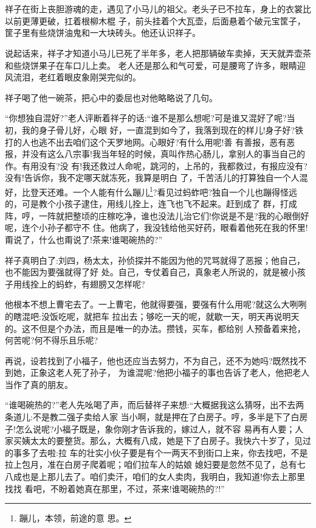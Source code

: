 \documentclass[11pt,a4paper,onecolumn]{article}
\begin{document}
\pagebreak
\section{}

祥子在街上丧胆游魂的走，遇见了小马儿的祖父。老头子已不拉车，身上的衣裳比以前更薄更破，扛着根柳木棍
子，前头挂着个大瓦壶，后面悬着个破元宝筐子，筐子里有些烧饼油鬼和一大块砖头。他还认识祥子。

说起话来，祥子才知道小马儿已死了半年多，老人把那辆破车卖掉，天天就弄壶茶和些烧饼果子在车口儿上卖。
老人还是那么和气可爱，可是腰弯了许多，眼睛迎风流泪，老红着眼皮象刚哭完似的。

祥子喝了他一碗茶，把心中的委屈也对他略略说了几句。

``你想独自混好?''老人评断着祥子的话:``谁不是那么想呢?可是谁又混好了呢?当初，我的身子骨儿好，心眼
好，一直混到如今了，我落到现在的样儿!身子好?铁打的人也逃不出去咱们这个天罗地网。心眼好?有什么用呢!善
有善报，恶有恶报，并没有这么八宗事!我当年轻的时候，真叫作热心肠儿，拿别人的事当自己的作。有用没有?没
有!我还救过人命呢，跳河的，上吊的，我都救过，有报应没有?没有!告诉你，我不定哪天就冻死，我算是明白
了，千苦活儿的打算独自一个人混好，比登天还难。一个人能有什么蹦儿\footnote{蹦儿，本领，前途的意
  思。}?看见过蚂蚱吧?独自一个儿也蹦得怪远的，可是教个小孩子逮住，用线儿拴上，连飞也飞不起来。赶到成了
群，打成阵，哼，一阵就把整顷的庄稼吃净，谁也没法儿治它们!你说是不是?我的心眼倒好呢，连个小孙子都守不
住。他病了，我没钱给他买好药，眼看着他死在我的怀里!甭说了，什么也甭说了!\myrule 茶来!谁喝碗热的?''

祥子真明白了:刘四，杨太太，孙侦探\myrule 并不能因为他的咒骂就得了恶报；他自己，也不能因为要强就得了好
处。自己，专仗着自己，真象老人所说的，就是被小孩子用线拴上的蚂蚱，有翅膀又怎样呢?

他根本不想上曹宅去了。一上曹宅，他就得要强，要强有什么用呢?就这么大咧咧的瞎混吧:没饭吃呢，就把车
拉出去；够吃一天的呢，就歇一天，明天再说明天的。这不但是个办法，而且是唯一的办法。攒钱，买车，都给别
人预备着来抢，何苦呢?何不得乐且乐呢?

再说，设若找到了小福子，他也还应当去努力，不为自己，还不为她吗?既然找不到她，正象这老人死了孙子，
为谁混呢?他把小福子的事也告诉了老人，他把老人当作了真的朋友。

``谁喝碗热的?''老人先吆喝了声，而后替祥子来想:``大概据我这么猜呀，出不去两条道儿:不是教二强子卖给人家
当小啊，就是押在了白房子。哼，多半是下了白房子!怎么说呢?小福子既是，象你刚才告诉我的，嫁过人，就不容
易再有人要；人家买姨太太的要整货。那么，大概有八成，她是下了白房子。我快六十岁了，见过的事多了去啦:拉
车的壮实小伙子要是有个一两天不到街口上来，你去找吧，不是拉上包月，准在白房子爬着呢；咱们拉车人的姑娘
媳妇要是忽然不见了，总有七八成也是上那儿去了。咱们卖汗，咱们的女人卖肉，我明白，我知道!你去上那里找找
看吧，不盼着她真在那里，不过，\myrule 茶来!谁喝碗热的?!''
\end{document}
